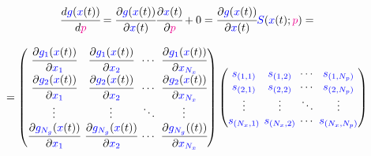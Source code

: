 \documentclass[../Article_Model_Parameters.tex]{subfiles}
\begin{document}
	{\footnotesize
		\begin{equation} \label{EQ:Output_sens_full}
			\cfrac{d {\color{blue}g}({\color{blue}x}(t))}{d {\color{magenta}p}} = \cfrac{\partial {\color{blue}g}({\color{blue}x}(t))}{\partial {\color{blue}x}(t)} \cfrac{\partial {\color{blue}x}(t)}{\partial {\color{magenta}p}} + 0 = \cfrac{\partial {\color{blue}g}({\color{blue}x}(t))}{\partial {\color{blue}x}(t)}  {\color{blue}S}({\color{blue}x}(t);{\color{magenta}p}) = 
		\end{equation} 
		
		\begin{equation} 
			= \begingroup %
			\setlength\arraycolsep{2pt}
			\begin{pmatrix}
				\cfrac{\partial {\color{blue}g_{1}}({\color{blue}x}(t))}{\partial {\color{blue}x_{1}}} & \cfrac{\partial {\color{blue}g_{1}}({\color{blue}x}(t))}{\partial {\color{blue}x_{2}}} & \cdots & \cfrac{\partial {\color{blue}g_{1}}({\color{blue}x}(t))}{\partial {\color{blue}x_{N_x}}}\\
				\cfrac{\partial {\color{blue}g_{2}}({\color{blue}x}(t))}{\partial {\color{blue}x_{1}}} & \cfrac{\partial {\color{blue}g_{2}}({\color{blue}x}(t))}{\partial {\color{blue}x_{2}}} & \cdots & \cfrac{\partial {\color{blue}g_{2}}({\color{blue}x}(t))}{\partial {\color{blue}x_{N_x}}}\\
				\vdots & \vdots & \ddots & \vdots\\
				\cfrac{\partial {\color{blue}g_{N_g}}({\color{blue}x}(t))}{\partial {\color{blue}x_{1}}} & \cfrac{\partial {\color{blue}g_{N_g}}({\color{blue}x}(t))}{\partial {\color{blue}x_{2}}} & \cdots & \cfrac{\partial {\color{blue}g_{N_g}}({\color{blue}}(t))}{\partial {\color{blue}x_{N_x}}}
			\end{pmatrix}
			\begin{pmatrix}
				{\color{blue}s_{({1,1})}} & {\color{blue}s_{({1,2})}} & \cdots & {\color{blue}s_{({1,N_p})}}\\
				{\color{blue}s_{({2,1})}} & {\color{blue}s_{({2,2})}} & \cdots & {\color{blue}s_{({2,N_p})}}\\
				\vdots & \vdots & \ddots & \vdots\\
				{\color{blue}s_{({N_x,1})}} & {\color{blue}s_{({N_x,2})}} & \cdots & {\color{blue}s_{({N_x,N_p})}}\\
			\end{pmatrix}
			\endgroup
	\end{equation} }
	
\end{document}
